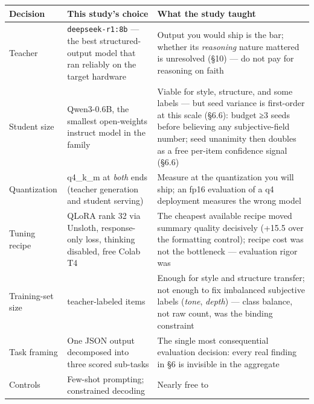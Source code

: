 \documentclass[11pt]{article}
\begin{document}
\begin{longtable}[]{@{}
  >{\raggedright\arraybackslash}p{}
  >{\raggedright\arraybackslash}p{}
  >{\raggedright\arraybackslash}p{}@{}}
\toprule\noalign{}
\begin{minipage}[b]{\linewidth}\raggedright
Decision
\end{minipage} & \begin{minipage}[b]{\linewidth}\raggedright
This study's choice
\end{minipage} & \begin{minipage}[b]{\linewidth}\raggedright
What the study taught
\end{minipage} \\
\midrule\noalign{}
\endhead
\bottomrule\noalign{}
\endlastfoot
Teacher & \texttt{deepseek-r1:8b} --- the best structured-output model
that ran reliably on the target hardware & Output you would ship is the
bar; whether its \emph{reasoning} nature mattered is unresolved (§10)
--- do not pay for reasoning on faith \\
Student size & Qwen3-0.6B, the smallest open-weights instruct model in
the family & Viable for style, structure, and some labels --- but seed
variance is first-order at this scale (§6.6): budget ≥3 seeds before
believing any subjective-field number; seed unanimity then doubles as a
free per-item confidence signal (§6.6) \\
Quantization & q4\_k\_m at \emph{both} ends (teacher generation and
student serving) & Measure at the quantization you will ship; an fp16
evaluation of a q4 deployment measures the wrong model \\
Tuning recipe & QLoRA rank 32 via Unsloth, response-only loss, thinking
disabled, free Colab T4 & The cheapest available recipe moved summary
quality decisively (+15.5 over the formatting control); recipe cost was
not the bottleneck --- evaluation rigor was \\
Training-set size & 401 teacher-labeled items & Enough for style and
structure transfer; not enough to fix imbalanced subjective labels
(\emph{tone}, \emph{depth}) --- class balance, not raw count, was the
binding constraint \\
Task framing & One JSON output decomposed into three scored sub-tasks &
The single most consequential evaluation decision: every real finding in
§6 is invisible in the aggregate \\
Controls & Few-shot prompting; constrained decoding & Nearly free to

\end{longtable}
\end{document}

